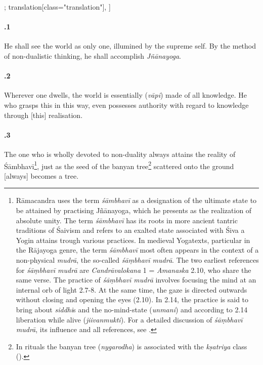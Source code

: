 \begin{alignment}[
  texts=edition[class="edition"];
  translation[class="translation"],
  ]
\begin{translation}
\begin{tlate}[21_1]
       \paragraph{.1} He shall see the world as only one, illumined by the supreme self. By the method of non-dualistic thinking, he shall accomplish \textit{Jñānayoga}.
     \end{tlate}
     \begin{tlate}[21_2]
       \paragraph{.2} Wherever one dwells, the world is essentially (\textit{vāpi}) made of all knowledge. He who grasps this in this way, even possesses authority with regard to knowledge through [this] realisation. %
     \end{tlate}
     \begin{tlate}[21_3]
       \paragraph{.3} The one who is wholly devoted to non-duality always attains the reality of Śāmbhavī\footnote{Rāmacandra uses the term \textit{śāmbhavī} as a designation of the ultimate state to be attained by practising Jñānayoga, which he presents as the realization of absolute unity. The term \textit{śāmbhavī} has its roots in more ancient tantric traditions of Śaivism and refers to an exalted state associated with Śiva a Yogin attains trough various practices. In medieval Yogatexts, particular in the Rājayoga genre, the term \textit{śāmbhavī} most often appears in the context of a non-physical \textit{mudrā}, the so-called \textit{śāṃbhavī mudrā}. The two earliest references for \textit{śāṃbhavī mudrā} are \textit{Candrāvalokana} 1 = \textit{Amanaska} 2.10, who share the same verse. The practice of \textit{śāṃbhavī mudrā} involves focusing the mind at an internal orb of light  2.7-8. At the same time, the gaze is directed outwards without closing and opening the eyes  (2.10). In  2.14, the practice is said to bring about \textit{siddhi}s and the no-mind-state (\textit{unmani}) and according to  2.14 liberation while alive (\textit{jiivanmukti}). For a detailed discussion of \textit{śāṃbhavī mudrā}, its influence and all references, see \citeauthor[2013:71-79]{birch2013}.}, just as the seed of the banyan tree\footnote{In rituals the banyan tree (\textit{nygarodha}) is associated with the \textit{kṣatriya} class (\citeauthor[1998:27]{smith1998}).} scattered onto the ground [always] becomes a tree.
     \end{tlate}
     \begin{tlate}[21_4]

\end{tlate}
\end{translation}
\end{alignment}
